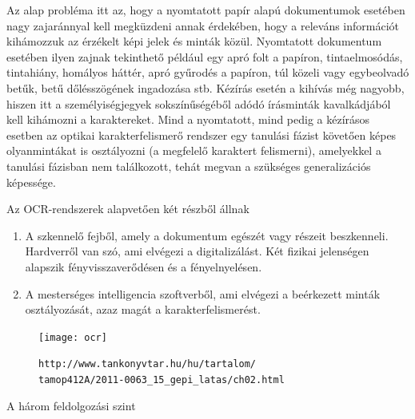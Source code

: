 Az alap probléma itt az, hogy a nyomtatott papír alapú dokumentumok esetében nagy zajaránnyal kell megküzdeni annak érdekében, hogy a releváns információt kihámozzuk az érzékelt képi jelek és minták közül. Nyomtatott dokumentum esetében ilyen zajnak tekinthető például egy apró folt a papíron, tintaelmosódás, tintahiány, homályos háttér, apró gyűrodés a papíron, túl közeli vagy egybeolvadó betűk, betű dőlésszögének ingadozása stb. Kézírás esetén a kihívás még nagyobb, hiszen itt a személyiségjegyek sokszínűségéből adódó írásminták kavalkádjából kell kihámozni a karaktereket. Mind a nyomtatott, mind pedig a kézírásos esetben az optikai karakterfelismerő rendszer egy tanulási fázist követően képes olyanmintákat is osztályozni (a megfelelő karaktert felismerni), amelyekkel a tanulási fázisban nem találkozott, tehát megvan a szükséges generalizációs képessége.

Az OCR-rendszerek alapvetően két részből állnak
\begin{enumerate}
\item A szkennelő fejből, amely a dokumentum egészét vagy részeit beszkenneli. Hardverről van szó, ami elvégezi a digitalizálást. Két fizikai jelenségen alapszik fényvisszaverődésen és a fényelnyelésen.
\item  A mesterséges intelligencia szoftverből, ami elvégezi a beérkezett minták osztályozását, azaz magát a karakterfelismerést.
\end{enumerate}

\begin{figure}[h]
\texttt{[image: ocr]}
\centering
\caption[caption]{\texttt{http://www.tankonyvtar.hu/hu/tartalom/\\\hspace{\textwidth}tamop412A/2011-0063\_15\_gepi\_latas/ch02.html}}
\end{figure}

A három feldolgozási szint

